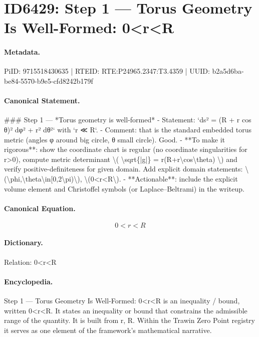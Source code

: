 \section*{ID6429: Step 1 — Torus Geometry Is Well-Formed: 0<r<R}
\paragraph{Metadata.}
PiID: 9715518430635 | RTEID: RTE:P24965.2347:T3.4359 | UUID: b2a5d6ba-be84-5570-b9e5-cfd8242b179f

\paragraph{Canonical Statement.}
\#\#\# Step 1 — *Torus geometry is well-formed* - Statement: `ds² = (R + r cos θ)² dφ² + r² dθ²` with `r ≪ R`. - Comment: that is the standard embedded torus metric (angles φ around big circle, θ small circle). Good. - **To make it rigorous**: show the coordinate chart is regular (no coordinate singularities for r>0), compute metric determinant \textbackslash{}( \textbackslash{}sqrt\{|g|\} = r(R+r\textbackslash{}cos\textbackslash{}theta) \textbackslash{}) and verify positive-definiteness for given domain. Add explicit domain statements: \textbackslash{}(\textbackslash{}phi,\textbackslash{}theta\textbackslash{}in[0,2\textbackslash{}pi)\textbackslash{}), \textbackslash{}(0<r<R\textbackslash{}). - **Actionable**: include the explicit volume element and Christoffel symbols (or Laplace–Beltrami) in the writeup.

\paragraph{Canonical Equation.}
\[
0<r<R
\]

\paragraph{Dictionary.}
Relation: 0<r<R

\paragraph{Encyclopedia.}
Step 1 — Torus Geometry Is Well-Formed: 0<r<R is an inequality / bound, written 0<r<R. It states an inequality or bound that constrains the admissible range of the quantity. It is built from r, R. Within the Trawin Zero Point registry it serves as one element of the framework's mathematical narrative.
